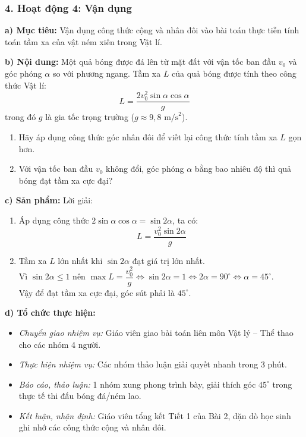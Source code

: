 \documentclass[12pt, a4paper]{article}
\begin{document}
\subsubsection*{4. Hoạt động 4: Vận dụng}
\textbf{a) Mục tiêu:} Vận dụng công thức cộng và nhân đôi vào bài toán thực tiễn tính toán tầm xa của vật ném xiên trong Vật lí.

\textbf{b) Nội dung:}
Một quả bóng được đá lên từ mặt đất với vận tốc ban đầu $v_0$ và góc phóng $\alpha$ so với phương ngang. Tầm xa $L$ của quả bóng được tính theo công thức Vật lí:
$$L = \dfrac{2 v_0^2 \sin\alpha \cos\alpha}{g}$$
trong đó $g$ là gia tốc trọng trường ($g \approx 9{,}8\text{ m/s}^2$).
\begin{enumerate}[leftmargin=0.5cm]
    \item Hãy áp dụng công thức góc nhân đôi để viết lại công thức tính tầm xa $L$ gọn hơn.
    \item Với vận tốc ban đầu $v_0$ không đổi, góc phóng $\alpha$ bằng bao nhiêu độ thì quả bóng đạt tầm xa cực đại?
\end{enumerate}

\textbf{c) Sản phẩm:} Lời giải:
\begin{enumerate}[leftmargin=0.5cm]
    \item Áp dụng công thức $2\sin\alpha \cos\alpha = \sin 2\alpha$, ta có:
    $$L = \dfrac{v_0^2 \sin 2\alpha}{g}$$
    \item Tầm xa $L$ lớn nhất khi $\sin 2\alpha$ đạt giá trị lớn nhất.\\
    Vì $\sin 2\alpha \le 1$ nên $\max L = \dfrac{v_0^2}{g} \iff \sin 2\alpha = 1 \iff 2\alpha = 90^\circ \iff \alpha = 45^\circ$.\\
    Vậy để đạt tầm xa cực đại, góc sút phải là $45^\circ$.
\end{enumerate}

\textbf{d) Tổ chức thực hiện:}
\begin{itemize}[leftmargin=0.6cm]
    \item \textit{Chuyển giao nhiệm vụ:} Giáo viên giao bài toán liên môn Vật lý -- Thể thao cho các nhóm 4 người.
    \item \textit{Thực hiện nhiệm vụ:} Các nhóm thảo luận giải quyết nhanh trong 3 phút.
    \item \textit{Báo cáo, thảo luận:} 1 nhóm xung phong trình bày, giải thích góc $45^\circ$ trong thực tế thi đấu bóng đá/ném lao.
    \item \textit{Kết luận, nhận định:} Giáo viên tổng kết Tiết 1 của Bài 2, dặn dò học sinh ghi nhớ các công thức cộng và nhân đôi.
\end{itemize}
\end{document}
